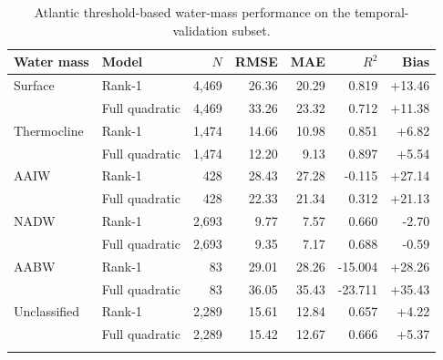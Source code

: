 \begin{table}[htbp]
\centering
\caption{Atlantic threshold-based water-mass performance on the temporal-validation subset.}
\label{tab:watermass}
\small
\begin{tabular}{llrrrrr}
\toprule
Water mass & Model & $N$ & RMSE & MAE & $R^2$ & Bias \\
\midrule
Surface & Rank-1 & 4,469 & 26.36 & 20.29 & 0.819 & +13.46 \\
 & Full quadratic & 4,469 & 33.26 & 23.32 & 0.712 & +11.38 \\
\addlinespace
Thermocline & Rank-1 & 1,474 & 14.66 & 10.98 & 0.851 & +6.82 \\
 & Full quadratic & 1,474 & 12.20 & 9.13 & 0.897 & +5.54 \\
\addlinespace
AAIW & Rank-1 & 428 & 28.43 & 27.28 & -0.115 & +27.14 \\
 & Full quadratic & 428 & 22.33 & 21.34 & 0.312 & +21.13 \\
\addlinespace
NADW & Rank-1 & 2,693 & 9.77 & 7.57 & 0.660 & -2.70 \\
 & Full quadratic & 2,693 & 9.35 & 7.17 & 0.688 & -0.59 \\
\addlinespace
AABW & Rank-1 & 83 & 29.01 & 28.26 & -15.004 & +28.26 \\
 & Full quadratic & 83 & 36.05 & 35.43 & -23.711 & +35.43 \\
\addlinespace
Unclassified & Rank-1 & 2,289 & 15.61 & 12.84 & 0.657 & +4.22 \\
 & Full quadratic & 2,289 & 15.42 & 12.67 & 0.666 & +5.37 \\
\addlinespace
\bottomrule
\end{tabular}
\end{table}
